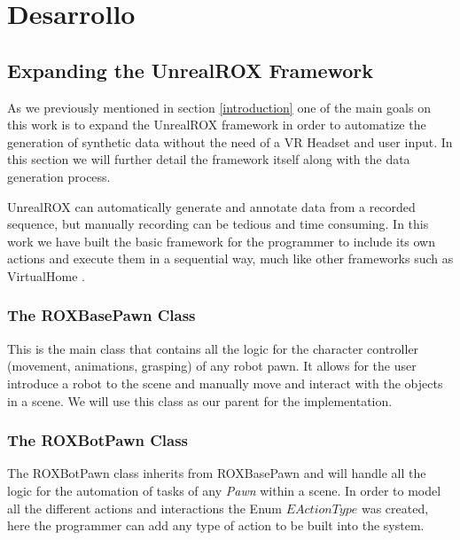 
\chapter{Desarrollo}
\label{desarrollo}

\section{Expanding the UnrealROX Framework}
As we previously mentioned in section \ref{introduction} one of the main goals on this work is to expand the UnrealROX framework in order to automatize the generation of synthetic data without the need of a VR Headset and user input. In this section we will further detail the framework itself along with the data generation process.

UnrealROX can automatically generate and annotate data from a recorded sequence, but manually recording can be tedious and time consuming. In this work we have built the basic framework for the programmer to include its own actions and execute them in a sequential way, much like other frameworks such as VirtualHome \cite{virtualhome2018}. 

\subsection{The ROXBasePawn Class}
This is the main class that contains all the logic for the character controller (movement, animations, grasping) of any robot pawn. It allows for the user introduce a robot to the scene and manually move and interact with the objects in a scene. We will use this class as our parent for the implementation.

\subsection{The ROXBotPawn Class}
The ROXBotPawn class inherits from ROXBasePawn and will handle all the logic for the automation of tasks of any \textit{Pawn} within a scene. In order to model all the different actions and interactions the Enum $EActionType$ was created, here the programmer can add any type of action to be built into the system.

